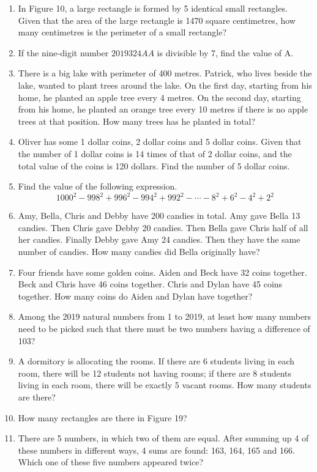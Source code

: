 \documentclass[11pt]{scrartcl}
\begin{document}
\begin{enumerate}
    \item In Figure 10, a large rectangle is formed by 5 identical small rectangles. Given that the area of the large rectangle is 1470 square centimetres, how many centimetres is the perimeter of a small rectangle?
    
    \item If the nine-digit number $2019324AA$ is divisible by 7, find the value of A.
    
    \item There is a big lake with perimeter of 400 metres. Patrick, who lives beside the lake, wanted to plant trees around the lake. On the first day, starting from his home, he planted an apple tree every 4 metres. On the second day, starting from his home, he planted an orange tree every 10 metres if there is no apple trees at that position. How many trees has he planted in total?
    
    \item Oliver has some 1 dollar coins, 2 dollar coins and 5 dollar coins. Given that the number of 1 dollar coins is 14 times of that of 2 dollar coins, and the total value of the coins is 120 dollars. Find the number of 5 dollar coins.
    
    \item Find the value of the following expression.
    \[1000^2 - 998^2 + 996^2 - 994^2 + 992^2 - \cdots - 8^2 + 6^2 - 4^2 + 2^2\]
    
    \item Amy, Bella, Chris and Debby have 200 candies in total. Amy gave Bella 13 candies. Then Chris gave Debby 20 candies. Then Bella gave Chris half of all her candies. Finally Debby gave Amy 24 candies. Then they have the same number of candies. How many candies did Bella originally have?
    
    \item Four friends have some golden coins. Aiden and Beck have 32 coins together. Beck and Chris have 46 coins together. Chris and Dylan have 45 coins together. How many coins do Aiden and Dylan have together?
    
    \item Among the 2019 natural numbers from 1 to 2019, at least how many numbers need to be picked such that there must be two numbers having a difference of 103?
    
    \item A dormitory is allocating the rooms. If there are 6 students living in each room, there will be 12 students not having rooms; if there are 8 students living in each room, there will be exactly 5 vacant rooms. How many students are there?
    
    \item How many rectangles are there in Figure 19?
    
    \item There are 5 numbers, in which two of them are equal. After summing up 4 of these numbers in different ways, 4 sums are found: 163, 164, 165 and 166. Which one of these five numbers appeared twice?
\end{enumerate}
\end{document}
